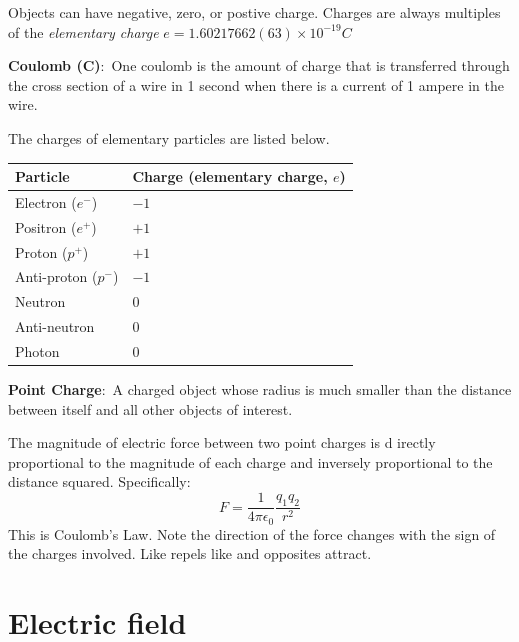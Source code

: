 \documentclass[nobib]{tufte-handout}
\newcommand{\defn}[2]{\noindent\textbf{#1}:\ #2}
\begin{document}
Objects can have negative, zero, or postive charge. 
Charges are always multiples of the \emph{elementary charge} $e = 1.60217662(63) \times 10^{-19} C$

\defn{Coulomb (C)}{One coulomb is the amount of charge that is
transferred through the cross section of a wire in 1 second
when there is a current of 1 ampere in the wire.}

The charges of elementary particles are listed below.
\begin{table}[ht]
    \centering
    \begin{tabular}{@{}ll@{}}
    \toprule
    Particle & Charge (elementary charge, $e$) \\
    \midrule
    Electron ($e^-$) & $-1$ \\
    Positron ($e^+$) & $+1$ \\
    Proton ($p^+$) & $+1$ \\
    Anti-proton ($p^-$) & $-1$ \\
    Neutron& $0$ \\
    Anti-neutron & $0$ \\
    Photon& $0$ \\
    \bottomrule
    \end{tabular}
    \end{table}

\defn{Point Charge}{A charged object whose
radius is much smaller than the distance
between itself and all other objects of
interest.}

The magnitude of electric force between two point charges is d
irectly proportional to the magnitude of each charge and 
inversely proportional to the distance squared. Specifically:
\[F = \frac{1}{4\pi \epsilon_0}\frac{q_1 q_2}{r^2}\]
This is Coulomb's Law. Note the direction of the force changes
with the sign of the charges involved. Like repels like and opposites
attract. 

\section{Electric field}
\end{document}
